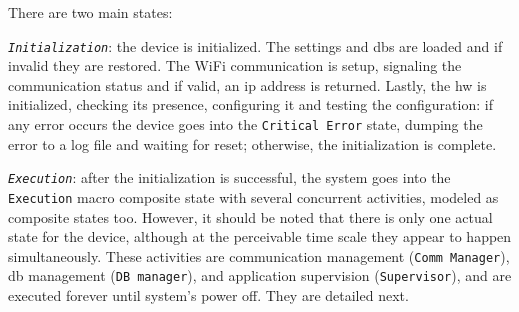 There are two main states:
\begin{item-c}
\item \emph{\texttt{Initialization}}: the device is initialized. The settings
  and \gls{db}s are loaded and if invalid they are restored. The WiFi
  communication is setup, signaling the communication status and if valid, an
  \gls{ip} address is returned. Lastly, the \gls{hw} is initialized, checking
  its presence, configuring it and testing the configuration: if any error
  occurs the device goes into the \texttt{Critical Error} state, dumping the
  error to a log file and waiting for reset; otherwise, the initialization is
  complete.
\item \emph{\texttt{Execution}}: after the initialization is successful, the
  system goes into the \texttt{Execution} macro composite state with several
  concurrent activities, modeled as composite states too. However, it should be
  noted that there is only one actual state for the device, although at the
  perceivable time scale they appear to happen simultaneously. These activities
  are communication management (\texttt{Comm Manager}), \gls{db} management
  (\texttt{DB manager}), and application supervision (\texttt{Supervisor}), and
  are executed forever until system's power off. They are detailed next.
\end{item-c}
%
